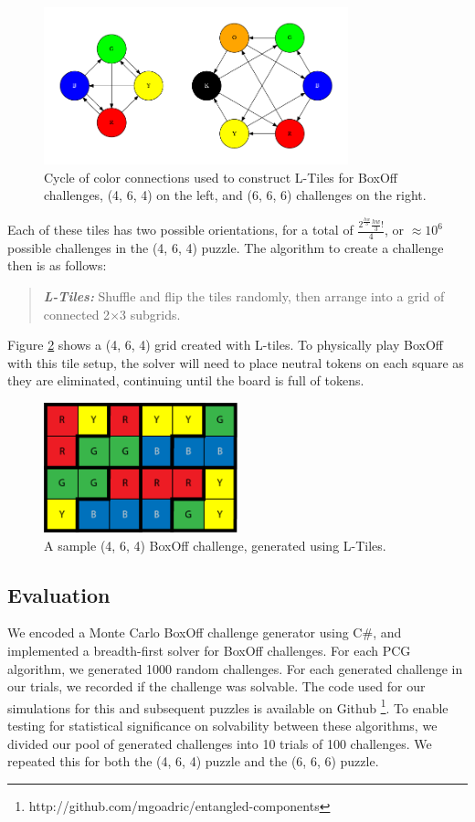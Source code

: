 \documentclass[journal]{IEEEtran}
\begin{document}
\begin{figure}[t]
\centering
\includegraphics[width=8.8cm]{boxoffcycle1.png}
\caption{Cycle of color connections used to construct L-Tiles for BoxOff challenges, (4, 6, 4) on the left, and (6, 6, 6) challenges on the right.}
\label{fig:boxoffcycle}
\end{figure}

Each of these tiles has two possible orientations, for a total of $\frac{2^{\frac{hw}{3}}\frac{hw}{3}!}{4}$, or $\approx 10^{6}$ possible challenges in the (4, 6, 4) puzzle. 
The algorithm to create a challenge then is as follows:

\begin{quote}
    {\it \bf L-Tiles:} Shuffle and flip the tiles randomly, then arrange into a grid of connected 2$\times$3 subgrids. 
\end{quote}

Figure \ref{fig:boxofftiles} shows a (4, 6, 4) grid created with L-tiles. To physically play BoxOff with this tile setup, the solver will need to place neutral tokens on each square as they are eliminated, continuing until the board is full of tokens. 

\begin{figure}[t]
\centering
\includegraphics[width=5.6cm]{boxoff46tiles1.png}
\caption{A sample (4, 6, 4) BoxOff challenge, generated using L-Tiles. }
\label{fig:boxofftiles}
\end{figure}

\subsection{Evaluation}
\noindent
We encoded a Monte Carlo BoxOff challenge generator using C\#, and implemented a breadth-first solver for BoxOff challenges. For each PCG algorithm, we generated 1000 random challenges. For each generated challenge in our trials, we recorded if the challenge was solvable. The code used for our simulations for this and subsequent puzzles is available on Github \footnote{http://github.com/mgoadric/entangled-components}. 
To enable testing for statistical significance on solvability between these algorithms, we divided our pool of generated challenges into 10 trials of 100 challenges. We repeated this for both the (4, 6, 4) puzzle and the (6, 6, 6) puzzle.
 
\end{document}

